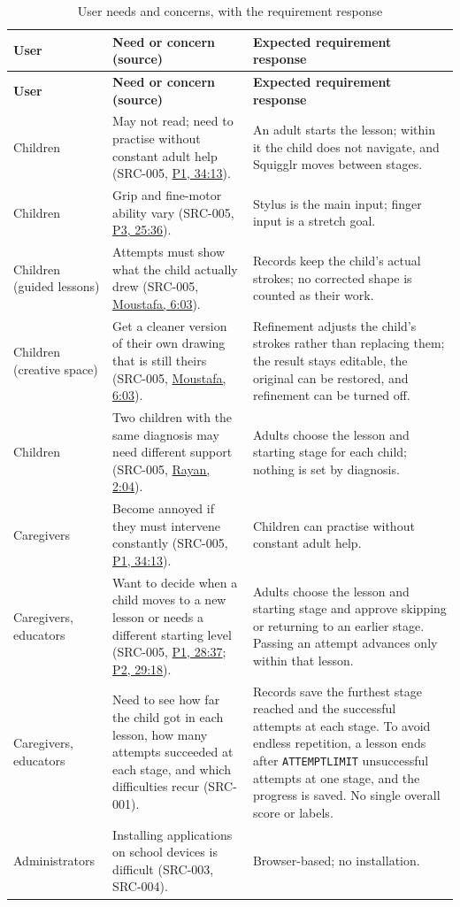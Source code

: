 \documentclass[12pt]{article}
\renewcommand{\_}{\textunderscore\allowbreak}%
\newcommand{\intlink}[3]{\hyperref[int:#1-#2]{#3}}
\newcommand{\intref}[2]{\intlink{#1}{#2}{#1, #2}}
\begin{document}
{\small
\begin{longtable}{@{}>{\raggedright\arraybackslash}p{}>{\raggedright\arraybackslash}p{}>{\raggedright\arraybackslash}p{}@{}}
\caption{User needs and concerns, with the requirement response}
\label{tab:userNeeds}\\
\toprule
\textbf{User} & \textbf{Need or concern (source)} & \textbf{Expected requirement
response} \\
\midrule
\endfirsthead
\toprule
\textbf{User} & \textbf{Need or concern (source)} & \textbf{Expected requirement
response} \\
\midrule
\endhead
\bottomrule
\endlastfoot
Children & May not read; need to practise without constant adult help (SRC-005,
\intref{P1}{34:13}). & An adult starts the lesson; within it the child does not
navigate, and Squigglr moves between stages. \\
Children & Grip and fine-motor ability vary (SRC-005, \intref{P3}{25:36}). &
Stylus is the main input; finger input is a stretch goal. \\
Children (guided lessons) & Attempts must show what the child actually drew
(SRC-005, \intref{Moustafa}{6:03}). & Records keep the child's actual strokes;
no corrected shape is counted as their work. \\
Children (creative space) & Get a cleaner version of their own drawing that is
still theirs (SRC-005, \intref{Moustafa}{6:03}). & Refinement adjusts the
child's strokes rather than replacing them; the result stays editable, the
original can be restored, and refinement can be turned off. \\
Children & Two children with the same diagnosis may need different support
(SRC-005, \intref{Rayan}{2:04}). & Adults choose the lesson and starting stage
for each child; nothing is set by diagnosis. \\
Caregivers & Become annoyed if they must intervene constantly (SRC-005,
\intref{P1}{34:13}). & Children can practise without constant adult help. \\
Caregivers, educators & Want to decide when a child moves to a new lesson or
needs a different starting level (SRC-005, \intref{P1}{28:37};
\intref{P2}{29:18}). & Adults choose the lesson and starting stage and approve
skipping or returning to an earlier stage. Passing an attempt advances only
within that lesson. \\
Caregivers, educators & Need to see how far the child got in each lesson, how
many attempts succeeded at each stage, and which difficulties recur (SRC-001). &
Records save the furthest stage reached and the successful attempts at each
stage. To avoid endless repetition, a lesson ends after \texttt{ATTEMPT\_LIMIT}
unsuccessful attempts at one stage, and the progress is saved. No single overall
score or labels. \\
Administrators & Installing applications on school devices is difficult
(SRC-003, SRC-004). & Browser-based; no installation. \\
\end{longtable}
}
\end{document}
